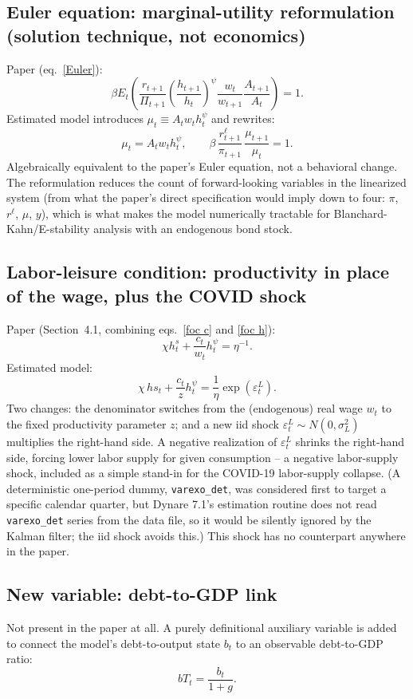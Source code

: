 \documentclass[11pt]{article}
\begin{document}
\subsection{Euler equation: marginal-utility reformulation (solution technique, not economics)}
Paper (eq.~\ref{Euler}):
\[
\beta E_t\!\left(\frac{r_{t+1}}{\Pi_{t+1}}\left(\frac{h_{t+1}}{h_t}\right)^\psi\frac{w_t}{w_{t+1}}\frac{A_{t+1}}{A_t}\right)=1.
\]
Estimated model introduces $\mu_t \equiv A_t w_t h_t^\psi$ and rewrites:
\[
\mu_t = A_t w_t h_t^{\psi}, \qquad
\beta\,\frac{r^\ell_{t+1}}{\pi_{t+1}}\,\frac{\mu_{t+1}}{\mu_t}=1.
\]
Algebraically equivalent to the paper's Euler equation, not a
behavioral change. The reformulation reduces the count of
forward-looking variables in the linearized system (from what the
paper's direct specification would imply down to four: $\pi$, $r^\ell$,
$\mu$, $y$), which is what makes the model numerically tractable for
Blanchard-Kahn/E-stability analysis with an endogenous bond stock.

\subsection{Labor-leisure condition: productivity in place of the wage, plus the COVID shock}
Paper (Section~4.1, combining eqs.~\ref{foc c} and \ref{foc h}):
\[
\chi h^s_t + \frac{c_t}{w_t}h_t^\psi = \eta^{-1}.
\]
Estimated model:
\[
\chi\, hs_t + \frac{c_t}{z}h_t^{\psi} = \frac{1}{\eta}\exp(\varepsilon^L_t).
\]
Two changes: the denominator switches from the (endogenous) real wage
$w_t$ to the fixed productivity parameter $z$; and a new iid shock
$\varepsilon^L_t\sim N(0,\sigma_L^2)$ multiplies the right-hand side. A
negative realization of $\varepsilon^L_t$ shrinks the right-hand side,
forcing lower labor supply for given consumption -- a negative
labor-supply shock, included as a simple stand-in for the COVID-19
labor-supply collapse. (A deterministic one-period dummy,
\texttt{varexo\_det}, was considered first to target a specific
calendar quarter, but Dynare 7.1's estimation routine does not read
\texttt{varexo\_det} series from the data file, so it would be silently
ignored by the Kalman filter; the iid shock avoids this.) This shock
has no counterpart anywhere in the paper.

\subsection{New variable: debt-to-GDP link}
Not present in the paper at all. A purely definitional auxiliary
variable is added to connect the model's debt-to-output state $b_t$ to
an observable debt-to-GDP ratio:
\[
bT_t = \frac{b_t}{1+g}.
\]
\end{document}
